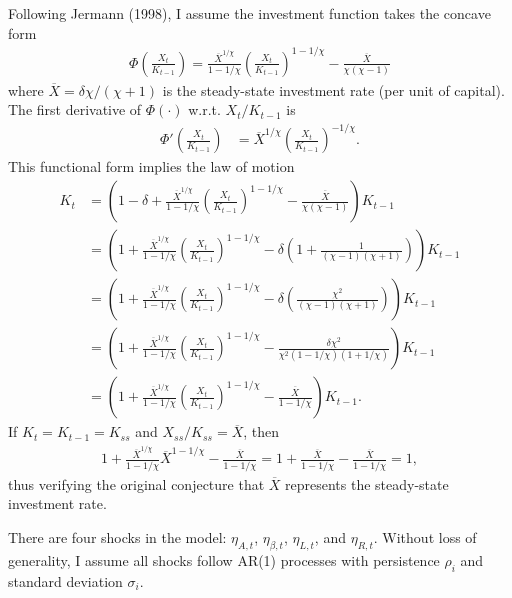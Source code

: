 \documentclass[12 pt, oneside]{article}
\theoremstyle{definition}
\theoremstyle{definition}
\theoremstyle{definition}
\begin{document}
Following Jermann (1998), I assume the investment function takes the concave form
\begin{align}\label{eq:invst fnct}
  \Phi\left(\frac{X_t}{K_{t - 1}}\right) = \frac{\overline{X}^{1/\chi}}{1 - 1/\chi}\left(\frac{X_t}{K_{t - 1}}\right)^{1 - 1/\chi} - \frac{\overline{X}}{\chi(\chi - 1)}
\end{align}
where $\overline{X} = \delta \chi / (\chi + 1)$ is the steady-state investment rate (per unit of capital). The first derivative of $\Phi(\cdot)$ w.r.t. $X_t / K_{t - 1}$ is
\begin{align}\label{eq:invst fnct first deriv}
    \Phi'\left(\frac{X_t}{K_{t - 1}}\right) & = \overline{X}^{1/\chi}\left(\frac{X_t}{ K_{t - 1}}\right)^{-1/\chi}.
\end{align}
This functional form implies the law of motion
\begin{align*}
  K_t & = \left(1 - \delta + \frac{\overline{X}^{1/\chi}}{1 - 1/\chi}\left(\frac{X_t}{K_{t - 1}}\right)^{1 - 1/\chi} - \frac{\overline{X}}{\chi(\chi - 1)}\right)K_{t - 1}\\
      & = \left(1 + \frac{\overline{X}^{1/\chi}}{1 - 1/\chi}\left(\frac{X_t}{K_{t - 1}}\right)^{1 - 1/\chi} -\delta \left(1 +  \frac{1}{(\chi - 1)(\chi + 1)}\right)\right)K_{t - 1}\\
      & = \left(1 + \frac{\overline{X}^{1/\chi}}{1 - 1/\chi}\left(\frac{X_t}{K_{t - 1}}\right)^{1 - 1/\chi} -\delta \left(\frac{\chi^2}{(\chi - 1)(\chi + 1)}\right)\right)K_{t - 1}\\
      & = \left(1 + \frac{\overline{X}^{1/\chi}}{1 - 1/\chi}\left(\frac{X_t}{K_{t - 1}}\right)^{1 - 1/\chi} -\frac{\delta\chi^2}{\chi^2(1 - 1 / \chi)(1 + 1 / \chi)}\right)K_{t - 1}\\
      & = \left(1 + \frac{\overline{X}^{1/\chi}}{1 - 1/\chi}\left(\frac{X_t}{K_{t - 1}}\right)^{1 - 1/\chi} -\frac{\overline{X}}{1 - 1 / \chi}\right)K_{t - 1}.
\end{align*}
If $K_t = K_{t - 1} = K_{ss}$ and $X_{ss} / K_{ss} = \overline{X}$, then
\begin{align*}
  1 + \frac{\overline{X}^{1 / \chi}}{1 - 1 / \chi}\overline{X}^{1 - 1 / \chi} - \frac{\overline{X}}{1 - 1 / \chi} =   1 + \frac{\overline{X}}{1 - 1 / \chi} - \frac{\overline{X}}{1 - 1 / \chi} = 1,
\end{align*}
thus verifying the original conjecture that $\overline{X}$ represents the steady-state investment rate.


There are four shocks in the model: $\eta_{A, t}$, $\eta_{\beta, t}$, $\eta_{L, t}$, and $\eta_{R, t}$. Without loss of generality, I assume all shocks follow AR(1) processes with persistence $\rho_i$ and standard deviation $\sigma_i$.\\
\end{document}
